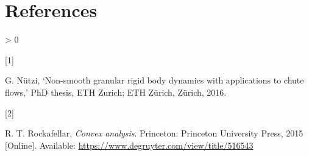 \documentclass[
  12pt,
  british,
  paper=a4,
  twoside,
  titlepage=true,
  openright,
  abstract=on,
  toc=listofnumbered,
  numbers=noenddot,
  chapterprefix=true,
  headings=optiontohead,
  svgnames,
  dvipsnames]{scrreprt}
\newlength{\cslhangindent}
\newlength{\csllabelwidth}
\newenvironment{CSLReferences}[2] %
 {%
  \setlength{\parindent}{0pt}
  \ifodd #1 \everypar{\setlength{\hangindent}{\cslhangindent}}\ignorespaces\fi
  \ifnum #2 > 0
  \setlength{\parskip}{#2\baselineskip}
  \fi
 }%
 {}
\newcommand{\CSLLeftMargin}[1]{\parbox[t]{\csllabelwidth}{#1}}
\newcommand{\CSLRightInline}[1]{\parbox[t]{\linewidth - \csllabelwidth}{#1}\break}
\begin{document}
\hypertarget{references}{%
\chapter*{References}\label{references}}

\hypertarget{refs}{}
\begin{CSLReferences}{0}{0}
\leavevmode\hypertarget{ref-nuetzig_thesis_2016}{}%
\CSLLeftMargin{{[}1{]} }
\CSLRightInline{G. Nützi, {`Non-smooth granular rigid body dynamics with
applications to chute flows,'} PhD thesis, ETH Zurich; ETH Zürich,
Zürich, 2016. }

\leavevmode\hypertarget{ref-rockafellar_convex_2015}{}%
\CSLLeftMargin{{[}2{]} }
\CSLRightInline{R. T. Rockafellar, \emph{Convex analysis}. Princeton:
Princeton University Press, 2015 {[}Online{]}. Available:
\url{https://www.degruyter.com/view/title/516543}}

\end{CSLReferences}
\end{document}
